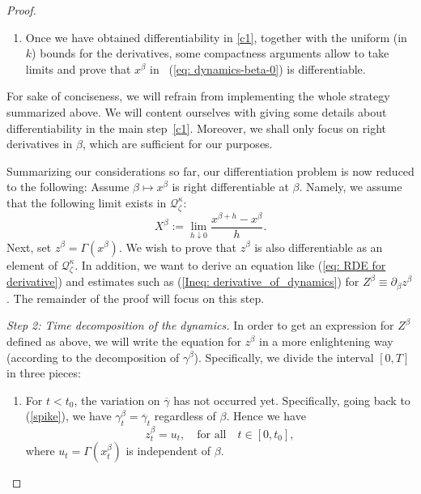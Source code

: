 \documentclass[12pt,reqno]{amsart}
\numberwithin{equation}{section}  %
\newcommand{\1}{{\bf 1}}
\newcommand{\2}{{\bf 2}}
\newcommand{\ga}{\gamma}
\newcommand{\ka}{\kappa}
\theoremstyle{remark}
\theoremstyle{remark}
\begin{document}
\begin{proof}
\begin{enumerate}[wide, labelwidth=!, labelindent=0pt, label=\textnormal{(\arabic*)}]
\item\label{it:differentiability-3} 
Once we have obtained differentiability in \eqref{c1}, together with the uniform (in $k$) bounds for the derivatives, some compactness arguments allow to take limits and prove that $x^{\beta}$ in ~(\ref{eq: dynamics-beta-0}) is differentiable.
\end{enumerate}
For sake of conciseness, we will refrain from implementing the whole strategy summarized above. We will content ourselves with giving some details about differentiability in the main step~\eqref{c1}. Moreover, we shall only focus on right derivatives in $\beta$, which are sufficient for our purposes.

Summarizing our considerations so far, our differentiation problem is now reduced to the following: Assume $\beta \mapsto x^{\beta}$ is right differentiable at $\beta$. Namely, we assume that the following limit exists in $\mathcal{Q}_{\zeta}^{\kappa}$:
\begin{equation}\label{eq: Derivative of xbeta}
    X^{\beta}:=\lim_{h\downarrow 0}\frac{x^{\beta+h}-x^{\beta}}{h}.
\end{equation}
 Next, set $z^{\beta}=\Gamma(x^{\beta})$. We wish to prove that $z^{\beta}$ is also differentiable as an element of $\mathcal{Q}_{\zeta}^{\ka}$. In addition, we want to derive an equation like (\ref{eq: RDE for derivative}) and estimates such as (\ref{Ineq: derivative_of_dynamics}) for $Z^{\beta}\equiv \partial_{\beta}z^{\beta}$. The remainder of the proof will focus on this step.

\smallskip
\noindent
\textit{Step 2: Time decomposition of the dynamics.} 
In order to get an expression for $Z^{\beta}$ defined as above, we will write the equation for $z^{\beta}$ in a more enlightening way (according to the decomposition of $\gamma^{\beta}$). Specifically, we divide the interval $[0,T]$ in three  pieces:

\begin{enumerate}[wide, labelwidth=!, labelindent=0pt, label=\textnormal{(\alph*)}]
\setlength\itemsep{.05in} 

\item \label{case: t<t_{0}}
For $t<t_{0}$, the variation on $\overline{\ga}$ has not occurred yet. Specifically, going back to (\ref{spike}), we have $\gamma^{\beta}_{t}=\overline{\gamma}_{t}$ regardless of $\beta$. Hence we have 
\begin{equation}\label{eq: dynamics-equiv}
z_{t}^{\beta}={u}_{t}, 
\quad \text{for all} \quad 
t\in [0,t_{0}],
\end{equation}
where $u_{t}=\Gamma(x^{\beta}_{t})$ is independent of $\beta$.


\end{enumerate}
\end{proof}
\end{document}
